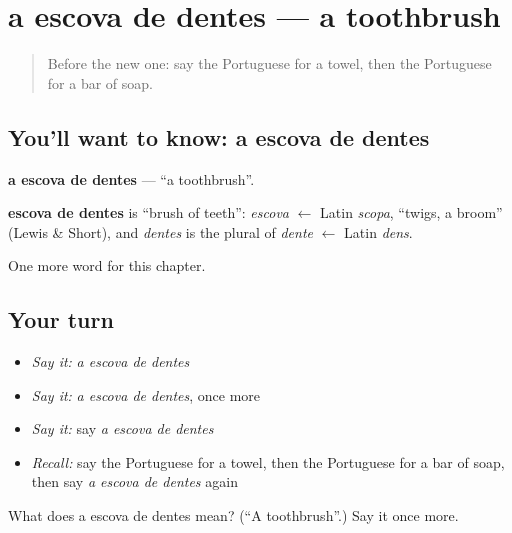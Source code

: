 \section[a escova de dentes]{a escova de dentes — a toothbrush}

\label{lesson:PT-C95-escova-de-dentes}



\begin{quote}
Before the new one: say the Portuguese for a towel, then the Portuguese for a bar of soap.
\end{quote}

\subsection*{You'll want to know: a escova de dentes}
\textbf{a escova de dentes} — \textquotedblleft{}a toothbrush\textquotedblright{}.

\begin{cousinweb}
\textbf{escova de dentes} is \textquotedblleft{}brush of teeth\textquotedblright{}: \emph{escova} $\leftarrow$ Latin \emph{scopa}, \textquotedblleft{}twigs, a broom\textquotedblright{} (Lewis \& Short), and \emph{dentes} is the plural of \emph{dente} $\leftarrow$ Latin \emph{dens}.
\end{cousinweb}

\begin{grammarlens}[title={What you've built}]
One more word for this chapter.
\end{grammarlens}

\subsection*{Your turn}
\begin{itemize}
\raggedright
  \item \emph{Say it:} \emph{a escova de dentes}
  \item \emph{Say it:} \emph{a escova de dentes}, once more
  \item \emph{Say it:} say \emph{a escova de dentes}
  \item \emph{Recall:} say the Portuguese for a towel, then the Portuguese for a bar of soap, then say \emph{a escova de dentes} again
\end{itemize}

\begin{tcolorbox}[breakable,colback=teal!4,colframe=teal!35!black,title={Before you move on}]
What does a escova de dentes mean? (\textquotedblleft{}A toothbrush\textquotedblright{}.) Say it once more.
\end{tcolorbox}
